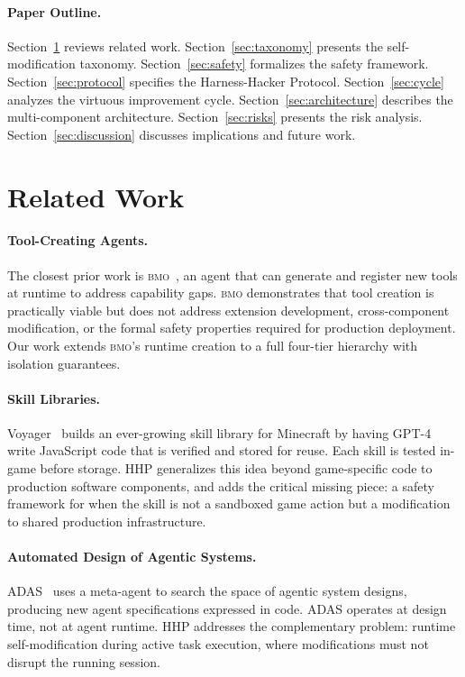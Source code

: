 \documentclass[11pt]{article}
\begin{document}
\paragraph{Paper Outline.}
Section~\ref{sec:related} reviews related work.
Section~\ref{sec:taxonomy} presents the self-modification taxonomy.
Section~\ref{sec:safety} formalizes the safety framework.
Section~\ref{sec:protocol} specifies the Harness-Hacker Protocol.
Section~\ref{sec:cycle} analyzes the virtuous improvement cycle.
Section~\ref{sec:architecture} describes the multi-component architecture.
Section~\ref{sec:risks} presents the risk analysis.
Section~\ref{sec:discussion} discusses implications and future work.

\section{Related Work}
\label{sec:related}

\paragraph{Tool-Creating Agents.}
The closest prior work is \textsc{bmo}~\cite{ngrok2024bmo}, an agent that
can generate and register new tools at runtime to address capability gaps.
\textsc{bmo} demonstrates that tool creation is practically viable but does not
address extension development, cross-component modification, or the formal safety
properties required for production deployment. Our work extends \textsc{bmo}'s
runtime creation to a full four-tier hierarchy with isolation guarantees.

\paragraph{Skill Libraries.}
Voyager~\cite{wang2023voyager} builds an ever-growing skill library for
Minecraft by having GPT-4 write JavaScript code that is verified and stored for
reuse. Each skill is tested in-game before storage. HHP generalizes this idea
beyond game-specific code to production software components, and adds the
critical missing piece: a safety framework for when the skill is not a
sandboxed game action but a modification to shared production infrastructure.

\paragraph{Automated Design of Agentic Systems.}
ADAS~\cite{hu2024adas} uses a meta-agent to search the space of agentic system
designs, producing new agent specifications expressed in code. ADAS operates
at design time, not at agent runtime. HHP addresses the complementary problem:
runtime self-modification during active task execution, where modifications must
not disrupt the running session.
\end{document}
